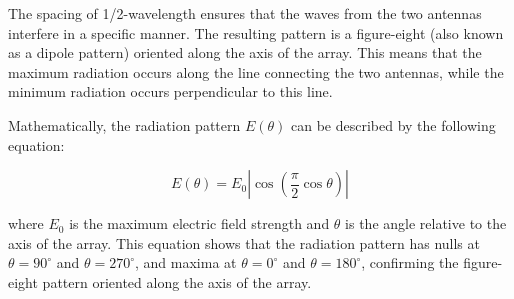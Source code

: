 The spacing of 1/2-wavelength ensures that the waves from the two antennas interfere in a specific manner. The resulting pattern is a figure-eight (also known as a dipole pattern) oriented along the axis of the array. This means that the maximum radiation occurs along the line connecting the two antennas, while the minimum radiation occurs perpendicular to this line.

Mathematically, the radiation pattern \( E(\theta) \) can be described by the following equation:

\[
E(\theta) = E_0 \left| \cos\left(\frac{\pi}{2} \cos\theta\right) \right|
\]

where \( E_0 \) is the maximum electric field strength and \( \theta \) is the angle relative to the axis of the array. This equation shows that the radiation pattern has nulls at \( \theta = 90^\circ \) and \( \theta = 270^\circ \), and maxima at \( \theta = 0^\circ \) and \( \theta = 180^\circ \), confirming the figure-eight pattern oriented along the axis of the array.

